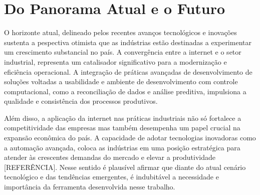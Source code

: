 \section{Do Panorama Atual e o Futuro}

O horizonte atual, delineado pelos recentes avanços tecnológicos e inovações sustenta a pespectiva otimista que as indústrias estão destinadas a experimentar um crescimento substancial no país. A convergência entre a internet e o setor industrial, representa um catalisador significativo para a modernização e eficiência operacional. A integração de práticas avançadas de desenvolvimento de soluções voltadas a usabilidade e ambiente de desenvolvimento com controle computacional, como a reconciliação de dados e análise preditiva, impulsiona a qualidade e consistência dos processos produtivos.

Além disso, a aplicação da internet nas práticas industriais não só fortalece a competitividade das empresas mas também desempenha um papel crucial na expansão econômica do país. A capacidade de adotar tecnologias inovadoras como a automação avançada, coloca as indústrias em uma posição estratégica para atender às crescentes demandas do mercado e elevar a produtividade [REFERÊNCIA]. Nesse sentido é plausível afirmar que diante do atual cenário tecnológico e das tendências emergentes, é indubitável a necessidade e importância da ferramenta desenvolvida nesse trabalho.

